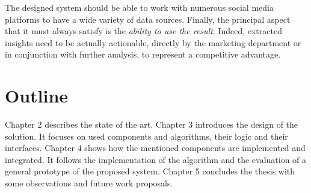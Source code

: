 The designed system should be able to work with numerous social media platforms to have a wide variety of data sources.
Finally, the principal aspect that it must always satisfy is the \emph{ability to use the result}. Indeed, extracted insights need to be actually actionable, directly by the marketing department or in conjunction with further analysis, to represent a competitive advantage.
\section{Outline}

Chapter 2 describes the state of the art. Chapter 3 introduces the design of the solution. It focuses on used components and algorithms, their logic and their interfaces. 
Chapter 4 shows how the mentioned components are implemented and integrated. It follows the implementation of the algorithm and the evaluation of a general prototype of the proposed system. 
Chapter 5 concludes the thesis with some observations and future work proposals.
